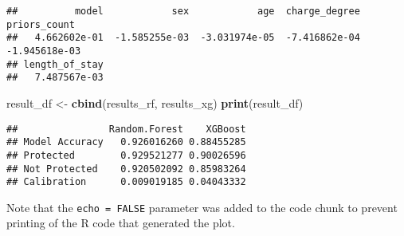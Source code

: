 \documentclass[
]{article}
\newenvironment{Shaded}{\begin{snugshade}}{\end{snugshade}}
\newcommand{\FunctionTok}[1]{\textcolor[rgb]{0.13,0.29,0.53}{\textbf{#1}}}
\newcommand{\NormalTok}[1]{#1}
\newcommand{\OtherTok}[1]{\textcolor[rgb]{0.56,0.35,0.01}{#1}}
\begin{document}
\begin{verbatim}
##          model            sex            age  charge_degree   priors_count 
##   4.662602e-01  -1.585255e-03  -3.031974e-05  -7.416862e-04  -1.945618e-03 
## length_of_stay 
##   7.487567e-03
\end{verbatim}

\begin{Shaded}
\begin{Highlighting}[]
\NormalTok{result\_df }\OtherTok{\textless{}{-}} \FunctionTok{cbind}\NormalTok{(results\_rf, results\_xg)}
\FunctionTok{print}\NormalTok{(result\_df)}
\end{Highlighting}
\end{Shaded}

\begin{verbatim}
##                Random.Forest    XGBoost
## Model Accuracy   0.926016260 0.88455285
## Protected        0.929521277 0.90026596
## Not Protected    0.920502092 0.85983264
## Calibration      0.009019185 0.04043332
\end{verbatim}

Note that the \texttt{echo\ =\ FALSE} parameter was added to the code
chunk to prevent printing of the R code that generated the plot.
\end{document}
